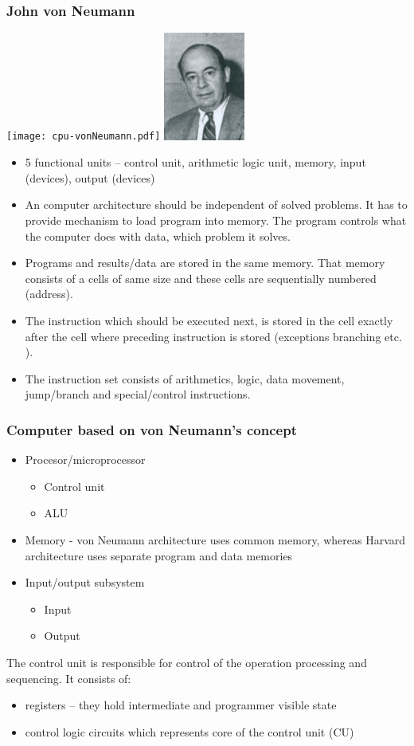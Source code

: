 \documentclass{beamer}
\begin{document}
\begin{frame}
\frametitle{John von Neumann}
\begin{center}
\texttt{[image: cpu-vonNeumann.pdf]}
\hfill
\includegraphics[width=0.2\textwidth]{fig/vonNeumann.png}
\end{center}
\begin{itemize}
\item 5 functional units – control unit, arithmetic logic unit, memory, input (devices), output (devices)
\item An computer architecture should be independent of solved problems. It has to provide mechanism to load program into memory. The program controls what the computer does with data, which problem it solves.
\item Programs and results/data are stored in the same memory. That memory consists of a cells of same size and these cells are sequentially numbered (address).
\item The instruction which should be executed next, is stored in the cell exactly after the cell where preceding instruction is stored (exceptions branching etc. ). 
\item The instruction set consists of arithmetics, logic, data movement, jump/branch and special/control instructions.
\end{itemize}
\end{frame}


\begin{frame}
\frametitle{Computer based on von Neumann's concept}

\begin{itemize}
\item Procesor/microprocessor
\begin{itemize}
\item Control unit
\item ALU
\end{itemize}
\item Memory - von Neumann architecture uses common memory, whereas Harvard architecture uses separate program and data memories
\item Input/output subsystem
\begin{itemize}
\item Input
\item Output
\end{itemize}
\end{itemize}
The control unit is responsible for control of the operation processing and sequencing. It consists of:
\begin{itemize}
\item registers – they hold intermediate and programmer visible state
\item control logic circuits which represents core of the control unit (CU)
\end{itemize}
\end{frame}
\end{document}

